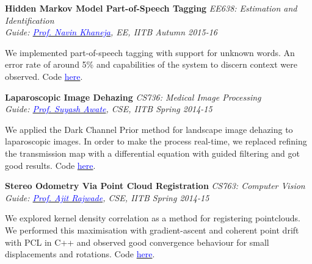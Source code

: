 \documentclass[margin,line]{res}
\newenvironment{list1}{
  \begin{list}{\ding{113}}{%
      \setlength{\itemsep}{0in}
      \setlength{\parsep}{0in} \setlength{\parskip}{0in}
      \setlength{\topsep}{0in} \setlength{\partopsep}{0in} 
      \setlength{\leftmargin}{0.17in}}}{\end{list}}
\begin{document}
\begin{resume}
\vspace*{-0.1in}

{\bf Hidden Markov Model Part-of-Speech Tagging} \hfill \textit{EE638: Estimation and Identification} \\
{\em Guide: \href{https://www.ee.iitb.ac.in/course/~ee638/Navin}{\textcolor{blue}{Prof. Navin Khaneja}}, EE, IITB \hfill Autumn 2015-16} \\
\vspace*{-.15in}
\begin{list1}
\item[] We implemented part-of-speech tagging with support for unknown words. An error rate of around 5\% and capabilities of the system to discern context were observed. Code \href{https://github.com/alankarkotwal/pos-tagging}{\textcolor{blue} {here}}.
\end{list1}

\vspace*{-0.1in}

{\bf Laparoscopic Image Dehazing} \hfill \textit{CS736: Medical Image Processing} \\
{\em Guide: \href{https://www.cse.iitb.ac.in/~suyash}{\textcolor{blue}{Prof. Suyash Awate}}, CSE, IITB \hfill Spring 2014-15} \\
\vspace*{-.15in}
\begin{list1}
\item[] We applied the Dark Channel Prior method for landscape image dehazing to laparoscopic images. In order to make the process real-time, we replaced refining the transmission map with a differential equation with guided filtering and got good results. Code \href{https://github.com/riddhishb/Laproscopic-Image-Dehazing}{\textcolor{blue} {here}}.
\end{list1}

\vspace*{-0.1in}

{\bf Stereo Odometry Via Point Cloud Registration} \hfill \textit{CS763: Computer Vision} \\
{\em Guide: \href{https://www.cse.iitb.ac.in/~ajitvr}{\textcolor{blue}{Prof. Ajit Rajwade}}, CSE, IITB \hfill Spring 2014-15} \\
\vspace*{-.15in}
\begin{list1}
\item[] We explored kernel density correlation as a method for registering pointclouds. We performed this maximisation with gradient-ascent and coherent point drift with PCL in C++ and observed good convergence behaviour for small displacements and rotations. Code \href{https://github.com/alankarkotwal/stereo-vo}{\textcolor{blue} {here}}.
\end{list1}


\end{resume}
\end{document}
